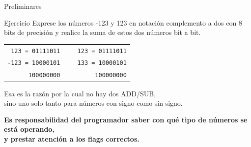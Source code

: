 \documentclass[aspectratio=169]{beamer}
\begin{document}
\begin{frame}[t,fragile]{Preliminares}
    \begin{block}{Ejercicio}
    Exprese los números -123 y 123 en notación complemento a dos
    con 8 bits de precisión y realice la suma de estos dos números bit a bit.
    \end{block}
    \pause
    \pause
    \begin{center}
    \begin{tabular}{lp{1cm}l}
    \verb| 123 = 01111011| & & \verb| 123 = 01111011| \\
    \verb|-123 = 10000101| & & \verb| 133 = 10000101| \\
    \cline{1-1} \cline{3-3}
    \verb|      100000000| & & \verb|      100000000| \\
    \end{tabular}
    \end{center}
    \pause
    Esa es la razón por la cual no hay dos ADD/SUB,\\
    sino uno solo tanto para números con signo como sin signo.
    \begin{center}
    \small
    \textbf{Es responsabilidad del programador saber con qué tipo de números se está operando,\\ y prestar atención a los flags correctos.}
    \end{center}
\end{frame}
\end{document}

